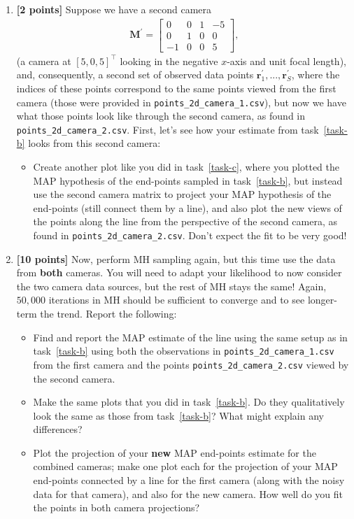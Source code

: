 \documentclass[10pt]{article}
\begin{document}
\begin{enumerate}
\item \label{task-e} {\bf [2 points]} Suppose we have a second camera
\begin{eqnarray*}
\mathbf{M}^{\prime} =
\begin{bmatrix}
0 & 0 & 1 & -5 \\
0 & 1 & 0 & 0 \\
-1 & 0 & 0 & 5
\end{bmatrix} ,
\end{eqnarray*}
(a camera at $[5, 0, 5]^{\top}$ looking in the negative $x$-axis and unit focal length), 
and, consequently, a second set of observed data points $\mathbf{r}^{\prime}_1, ..., \mathbf{r}^{\prime}_S$, where the indices of these points correspond to the same points viewed from the first camera (those were provided in {\tt points\_2d\_camera\_1.csv}), but now we have what those points look like through the second camera, as found in {\tt points\_2d\_camera\_2.csv}.  First, let's see how your estimate from task~\ref{task-b} looks from this second camera:
\begin{itemize}
\item Create another plot like you did in task~\ref{task-c}, where you plotted the MAP hypothesis of the end-points sampled in task~\ref{task-b}, but instead use the second camera matrix to project your MAP hypothesis of the end-points (still connect them by a line), and also plot the new views of the points along the line from the perspective of the second camera, as found in {\tt points\_2d\_camera\_2.csv}.  Don't expect the fit to be very good!
\end{itemize}

\item {\bf [10 points]} \label{task-f} Now, perform MH sampling again, but this time use the data from {\bf both} cameras.  You will need to adapt your likelihood to now consider the two camera data sources, but the rest of MH stays the same!  Again, $50,000$ iterations in MH should be sufficient to converge and to see longer-term the trend.
Report the following:
\begin{itemize}
\item Find and report the MAP estimate of the line using the same setup as in task~\ref{task-b} using both the observations in {\tt points\_2d\_camera\_1.csv} from the first camera and the points {\tt points\_2d\_camera\_2.csv} viewed by the second camera.
\item Make the same plots that you did in task~\ref{task-b}.  Do they qualitatively look the same as those from task~\ref{task-b}?  What might explain any differences?
\item Plot the projection of your {\bf new} MAP end-points estimate for the combined cameras; make one plot each for the projection of your MAP end-points connected by a line for the first camera (along with the noisy data for that camera), and also for the new camera.  How well do you fit the points in both camera projections?
\end{itemize}

\end{enumerate}
\end{document}
